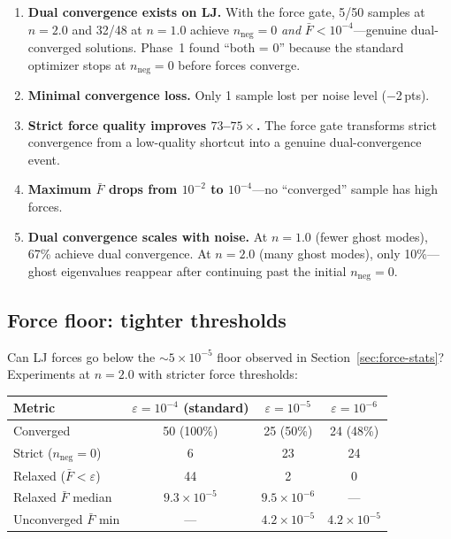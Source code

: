 \documentclass[11pt,a4paper]{article}
\theoremstyle{definition}
\begin{document}
\begin{tcolorbox}[finding, title=Finding 5: Force gate produces dual convergence]
\begin{enumerate}[nosep]
  \item \textbf{Dual convergence exists on LJ.}  With the force gate,
    5/50 samples at $n{=}2.0$ and 32/48 at $n{=}1.0$ achieve
    $n_\text{neg}{=}0$ \emph{and} $\bar{F} < 10^{-4}$---genuine
    dual-converged solutions.  Phase~1 found ``both = 0'' because the
    standard optimizer stops at $n_\text{neg}{=}0$ before forces converge.
  \item \textbf{Minimal convergence loss.}  Only 1 sample lost per noise
    level ($-$2\,pts).
  \item \textbf{Strict force quality improves $73$--$75\times$.}
    The force gate transforms strict convergence from a low-quality
    shortcut into a genuine dual-convergence event.
  \item \textbf{Maximum $\bar{F}$ drops from $10^{-2}$ to $10^{-4}$}---no
    ``converged'' sample has high forces.
  \item \textbf{Dual convergence scales with noise.}  At $n{=}1.0$ (fewer
    ghost modes), 67\% achieve dual convergence.  At $n{=}2.0$ (many ghost
    modes), only 10\%---ghost eigenvalues reappear after continuing past
    the initial $n_\text{neg}{=}0$.
\end{enumerate}
\end{tcolorbox}

\subsection{Force floor: tighter thresholds}

Can LJ forces go below the ${\sim}5 \times 10^{-5}$ floor observed in
Section~\ref{sec:force-stats}?  Experiments at $n{=}2.0$ with stricter
force thresholds:

\begin{center}\small
\begin{tabular}{l ccc}
\toprule
Metric & $\varepsilon{=}10^{-4}$ (standard) & $\varepsilon{=}10^{-5}$ & $\varepsilon{=}10^{-6}$ \\
\midrule
Converged       & 50 (100\%) & 25 (50\%) & 24 (48\%) \\
Strict ($n_\text{neg}{=}0$)  & 6  & 23 & 24 \\
Relaxed ($\bar{F} < \varepsilon$) & 44 & 2  & 0  \\
Relaxed $\bar{F}$ median & $9.3 \times 10^{-5}$ & $9.5 \times 10^{-6}$ & --- \\
Unconverged $\bar{F}$ min & --- & $4.2 \times 10^{-5}$ & $4.2 \times 10^{-5}$ \\
\bottomrule
\end{tabular}
\end{center}
\end{document}
